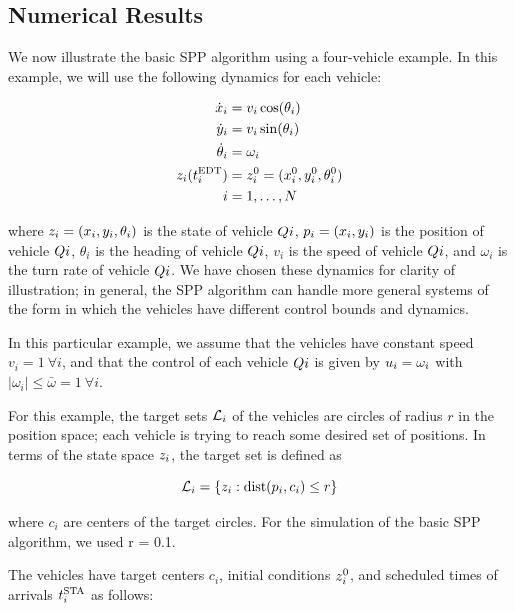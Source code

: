 \subsection{Numerical Results \label{sec:basic_results}}
We now illustrate the basic SPP algorithm using a four-vehicle example. In this example, we will use the following dynamics for each vehicle:

\begin{equation}
\begin{aligned}
\dot x_i &= v_i \cos(\theta_i) \\
\dot y_i &= v_i \sin(\theta_i) \\
\dot \theta_i &= \omega_i \\
z_i(t^\text{EDT}_i) &= z_i^0 = (x_i^0, y_i^0, \theta_i^0) \\
i &= 1, \ldots, N
\end{aligned}
\end{equation}

\noindent where $z_i = (x_i, y_i, \theta_i)$ is the state of vehicle $Q{i}$, $p_i = (x_i, y_i)$ is the position of vehicle $Q{i}$, $\theta_i$ is the heading of vehicle $Q{i}$, $v_i$ is the speed of vehicle $Q{i}$, and $\omega_i$ is the turn rate of vehicle $Q{i}$. We have chosen these dynamics for clarity of illustration; in general, the SPP algorithm can handle more general systems of the form in which the vehicles have different control bounds and dynamics. 

In this particular example, we assume that the vehicles have constant speed $v_i = 1 ~ \forall i$, and that the control of each vehicle $Q{i}$ is given by $u_i = \omega_i$ with $|\omega_i| \le \bar\omega = 1 ~ \forall i$. 

For this example, the target sets $\mathcal{L}_i$ of the vehicles are circles of radius $r$ in the position space; each vehicle is trying to reach some desired set of positions. In terms of the state space $z_i$, the target set is defined as

\begin{equation}
\label{eq:target_sim}
\targetset_i = \{z_i: \dist(p_i, c_i) \le r\}
\end{equation}

\noindent where $c_i$ are centers of the target circles. For the simulation of the basic SPP algorithm, we used r = 0.1.

The vehicles have target centers $c_i$, initial conditions $z_i^0$, and scheduled times of arrivals $t^\text{STA}_i$ as follows:

